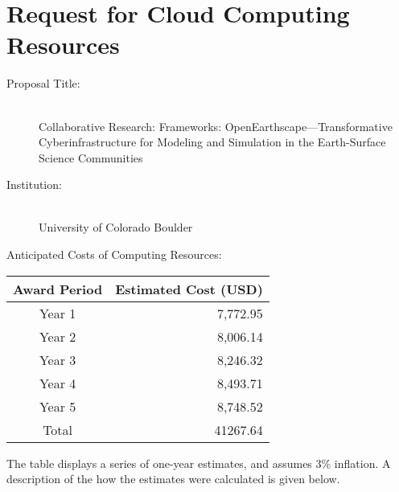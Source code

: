 \section*{Request for Cloud Computing Resources}
\label{sec:supplement-cloud}

\begin{description}
  \item[Proposal Title:] \hfill \\ Collaborative Research: Frameworks: OpenEarthscape---Transformative Cyberinfrastructure for Modeling and Simulation in the Earth-Surface Science Communities
  \item[Institution:] \hfill \\ University of Colorado Boulder
  \item[Anticipated Costs of Computing Resources:]
\end{description}

\begin{center}
\begin{tabular}{ ||c|r|| } 
 \hline
 Award Period & Estimated Cost (USD) \\ [0.5ex]
 \hline\hline
 Year 1 & 7,772.95 \\ 
 Year 2 & 8,006.14 \\ 
 Year 3 & 8,246.32 \\ 
 Year 4 & 8,493.71 \\ 
 Year 5 & 8,748.52 \\
 \hline
 Total  & 41267.64 \\ 
 \hline
\end{tabular}
\end{center}

The table displays a series of one-year estimates, and assumes 3\% inflation.
A description of the how the estimates were calculated is given below.

